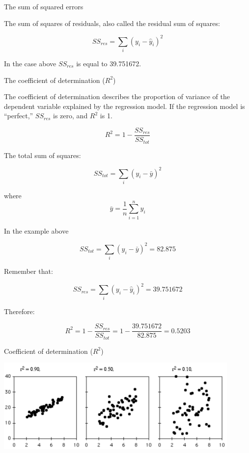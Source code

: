 \documentclass{beamer}
\begin{document}
\begin{frame}
{\centerline{The sum of squared errors}}

The sum of squares of residuals, also called the residual sum of squares:

$$SS_{res} = \sum_i (y_i - \hat{y}_i)^2$$

In the case above $SS_{res}$ is equal to 39.751672.

\end{frame}

\begin{frame}
{\centerline{The coefficient of determination ($R^2$)}}

The coefficient of determination describes the proportion of variance of the dependent variable explained by the regression model. If the regression model is ``perfect,'' $SS_{res}$ is zero, and $R^2$ is 1.

$$R^2 = 1 - \frac{SS_{res}}{SS_{tot}}$$

The total sum of squares:

$$SS_{tot} = \sum_i (y_i - \bar{y})^2$$

where 
$$\bar{y}=\frac{1}{n}\sum_{i=1}^n y_i$$

\end{frame}

\begin{frame}
{\centerline{In the example above}}

$$SS_{tot} = \sum_i (y_i - \bar{y})^2 = 82.875 $$

Remember that:

$$SS_{res} = \sum_i (y_i - \hat{y}_i)^2 = 39.751672$$

Therefore:

$$R^2 = 1 - \frac{SS_{res}}{SS_{tot}} = 1 - \frac{39.751672}{82.875} =  0.5203$$

\end{frame}

\begin{frame}
{\centerline{Coefficient of determination ($R^2$)}}


\begin{center}
\includegraphics[width=12cm]{P2023.AIBCCSS.FoundationsDataScience/r2.png}   
\end{center}
\end{frame}
\end{document}
